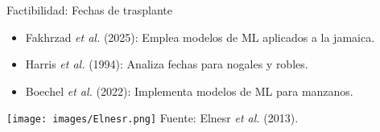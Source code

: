 \documentclass[aspectratio=169]{beamer}
\begin{document}
\begin{frame}{Factibilidad: Fechas de trasplante}
	\begin{minipage}{0.5\textwidth}
		\begin{block}{}
			\begin{itemize}
				\item Fakhrzad \textit{et al.} (2025): Emplea modelos de ML aplicados a la jamaica.
				\item Harris \textit{et al.} (1994): Analiza fechas para nogales y robles. 
				\item Boechel \textit{et al.} (2022): Implementa modelos de ML para manzanos.
			\end{itemize}
		\end{block}
	\end{minipage}%
	\begin{minipage}{0.5\textwidth}
		\hspace{0cm}
		\centering
		\texttt{[image: images/Elnesr.png]}
		{\scriptsize Fuente: Elnesr \textit{et al.} (2013).}
	\end{minipage}%
\end{frame}
\end{document}
